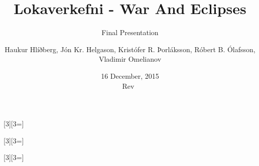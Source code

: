 
\title{Lokaverkefni - War And Eclipses}
\subtitle{Final Presentation}
\author[H.H., J.K.H., K.R.Þ., R.B.Ó., V.O]{Haukur Hlíðberg, Jón Kr. Helgason, Kristófer R. Þorláksson, Róbert B. Ólafsson, Vladimir Omelianov}
\date{16 December, 2015\\ Rev~\svnrev{}} %
\graphicspath{{graphics/}{graphics}}
\newcommand{\bookcite}{\parencite{carryer2011IntroMechatronics}\xspace}
\newcommand{\cg}[2][0.8]{\centering\texttt{[image: \#2]}}
\newcommand{\bookcap}[1]{#1\bookcite}
[3][3=]{}
[3][3=]{}
[3][3=]{}
\newcommand{\twocol}[2]{
\begin{columns}
    \begin{column}{.5\linewidth}
    #1
        \end{column}
        \begin{column}{.5\linewidth}
        #2
        \end{column}
\end{columns}
}
\renewcommand{\d}[1]{\;\textsf{d}#1}
\newcommand{\pd}[1]{\partial #1}
\newcommand{\D}{\;\textsf{D}}
\providecommand{\e}[1]{\ensuremath{\times 10^{#1}}}


\usepackage{tabularx}


